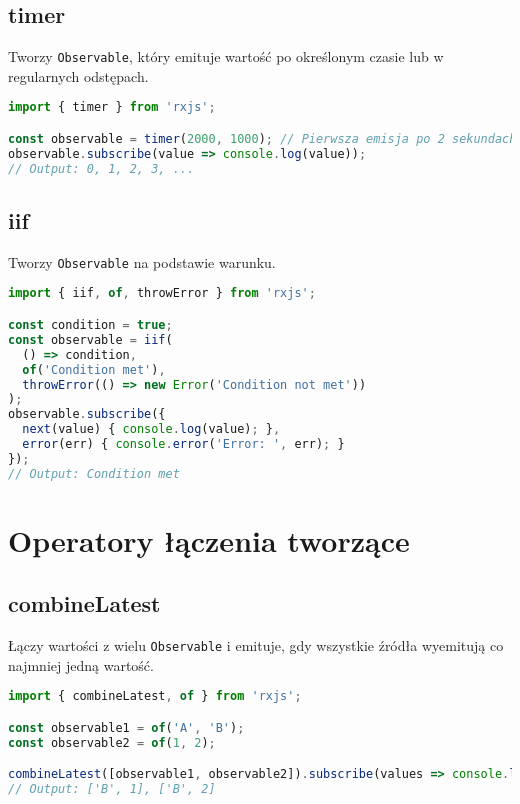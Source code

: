 \documentclass[a4paper,12pt]{article}
\begin{document}
\subsection{timer}
Tworzy \texttt{Observable}, który emituje wartość po określonym czasie lub w regularnych odstępach.

\begin{lstlisting}[language=JavaScript, caption=Przykład użycia \texttt{timer}]
import { timer } from 'rxjs';

const observable = timer(2000, 1000); // Pierwsza emisja po 2 sekundach, kolejne co 1 sekundę
observable.subscribe(value => console.log(value));
// Output: 0, 1, 2, 3, ...
\end{lstlisting}

\subsection{iif}
Tworzy \texttt{Observable} na podstawie warunku.

\begin{lstlisting}[language=JavaScript, caption=Przykład użycia \texttt{iif}]
import { iif, of, throwError } from 'rxjs';

const condition = true;
const observable = iif(
  () => condition,
  of('Condition met'),
  throwError(() => new Error('Condition not met'))
);
observable.subscribe({
  next(value) { console.log(value); },
  error(err) { console.error('Error: ', err); }
});
// Output: Condition met
\end{lstlisting}

\section{Operatory łączenia tworzące}
\subsection{combineLatest}
Łączy wartości z wielu \texttt{Observable} i emituje, gdy wszystkie źródła wyemitują co najmniej jedną wartość.

\begin{lstlisting}[language=JavaScript, caption=Przykład użycia \texttt{combineLatest}]
import { combineLatest, of } from 'rxjs';

const observable1 = of('A', 'B');
const observable2 = of(1, 2);

combineLatest([observable1, observable2]).subscribe(values => console.log(values));
// Output: ['B', 1], ['B', 2]
\end{lstlisting}
\end{document}
